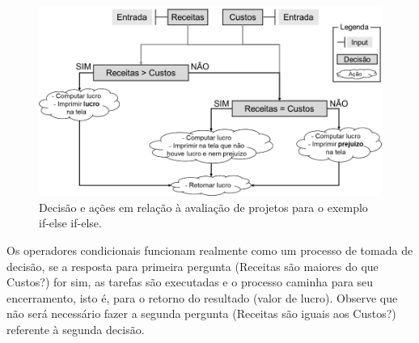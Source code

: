 \documentclass[
  11pt,
  a5paper,
  openany]{book}
\newenvironment{Shaded}{\begin{snugshade}}{\end{snugshade}}
\newcommand{\CharTok}[1]{\textcolor[rgb]{0.31,0.60,0.02}{#1}}
\newcommand{\CommentTok}[1]{\textcolor[rgb]{0.56,0.35,0.01}{\textit{#1}}}
\newcommand{\ControlFlowTok}[1]{\textcolor[rgb]{0.13,0.29,0.53}{\textbf{#1}}}
\newcommand{\KeywordTok}[1]{\textcolor[rgb]{0.13,0.29,0.53}{\textbf{#1}}}
\newcommand{\NormalTok}[1]{#1}
\newcommand{\OperatorTok}[1]{\textcolor[rgb]{0.81,0.36,0.00}{\textbf{#1}}}
\newcommand{\StringTok}[1]{\textcolor[rgb]{0.31,0.60,0.02}{#1}}
\begin{document}
\begin{figure}

{\centering \includegraphics[width=1\linewidth]{images/Fig_Cond5} 

}

\caption{Decisão e ações em relação à avaliação de projetos para o exemplo if-else if-else.}\label{fig:FigCond5}
\end{figure}

Os operadores condicionais funcionam realmente como um processo de tomada de decisão, se a resposta para primeira pergunta (Receitas são maiores do que Custos?) for sim, as tarefas são executadas e o processo caminha para seu encerramento, isto é, para o retorno do resultado (valor de lucro). Observe que não será necessário fazer a segunda pergunta (Receitas são iguais aos Custos?) referente à segunda decisão.

\begin{Shaded}
\end{Shaded}
\end{document}
